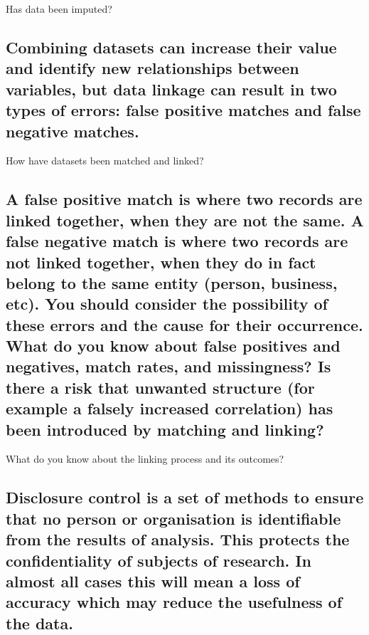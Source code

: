 \documentclass[]{book}
\begin{document}
 Has data been imputed?

\subsection{Combining datasets can increase their value and identify new
relationships between variables, but data linkage can result in two
types of errors: false positive matches and false negative
matches.}\label{combining-datasets-can-increase-their-value-and-identify-new-relationships-between-variables-but-data-linkage-can-result-in-two-types-of-errors-false-positive-matches-and-false-negative-matches.}

 How have datasets been matched and linked?

\subsection{A false positive match is where two records are linked
together, when they are not the same. A false negative match is where
two records are not linked together, when they do in fact belong to the
same entity (person, business, etc). You should consider the possibility
of these errors and the cause for their occurrence. What do you know
about false positives and negatives, match rates, and missingness? Is
there a risk that unwanted structure (for example a falsely increased
correlation) has been introduced by matching and
linking?}\label{a-false-positive-match-is-where-two-records-are-linked-together-when-they-are-not-the-same.-a-false-negative-match-is-where-two-records-are-not-linked-together-when-they-do-in-fact-belong-to-the-same-entity-person-business-etc.-you-should-consider-the-possibility-of-these-errors-and-the-cause-for-their-occurrence.-what-do-you-know-about-false-positives-and-negatives-match-rates-and-missingness-is-there-a-risk-that-unwanted-structure-for-example-a-falsely-increased-correlation-has-been-introduced-by-matching-and-linking}

 What do you know about the linking process and its outcomes?

\subsection{Disclosure control is a set of methods to ensure that no
person or organisation is identifiable from the results of analysis.
This protects the confidentiality of subjects of research. In almost all
cases this will mean a loss of accuracy which may reduce the usefulness
of the
data.}\label{disclosure-control-is-a-set-of-methods-to-ensure-that-no-person-or-organisation-is-identifiable-from-the-results-of-analysis.-this-protects-the-confidentiality-of-subjects-of-research.-in-almost-all-cases-this-will-mean-a-loss-of-accuracy-which-may-reduce-the-usefulness-of-the-data.}
\end{document}
